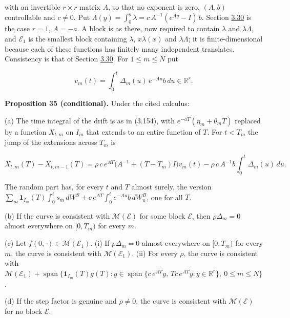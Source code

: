 \documentclass[11pt]{article}
\begin{document}
with an invertible \(r\times r\) matrix \(A\), so that no exponent is zero, \((A,b)\) controllable and \(c\neq0\). Put \(\Lambda(y)=\int_0^y\lambda=c\,A^{-1}(e^{Ay}-I)\,b\). Section \hyperref[sec:3.30]{3.30} is the case \(r=1\), \(A=-a\). A block is as there, now required to contain \(\lambda\) and \(\lambda\Lambda\), and \(\mathcal E_1\) is the smallest block containing \(\lambda\), \(x\lambda(x)\) and \(\lambda\Lambda\); it is finite-dimensional because each of these functions has finitely many independent translates. Consistency is that of Section \hyperref[sec:3.30]{3.30}. For \(1\le m\le N\) put

\begin{equation*}
v_m(t)=\int_0^t\Delta_m(u)\,e^{-Au}b\,du\in\mathbb R^r. \tag{3.157}\label{eq:3.157}
\end{equation*}

\label{res:Proposition-35}
\textbf{Proposition 35 (conditional).} Under the cited calculus:

(a) The time integral of the drift is as in (3.154), with \(e^{-aT}(\eta_m+\theta_mT)\) replaced by a function \(X_{t,m}\) on \(I_m\) that extends to an entire function of \(T\). For \(t<T_m\) the jump of the extensions across \(T_m\) is

\begin{equation*}
X_{t,m}(T)-X_{t,m-1}(T)=\rho\,c\,e^{AT}\bigl(A^{-1}+(T-T_m)I\bigr)v_m(t)-\rho\,c\,A^{-1}b\int_0^t\Delta_m(u)\,du. \tag{3.158}\label{eq:3.158}
\end{equation*}

The random part has, for every \(t\) and \(T\) almost surely, the version \(\sum_m\mathbf 1_{I_m}(T)\int_0^ts_m\,dW^S+c\,e^{AT}\int_0^te^{-Au}b\,dW^B_u\), one for all \(T\).

(b) If the curve is consistent with \(\mathcal M(\mathcal E)\) for some block \(\mathcal E\), then \(\rho\Delta_m=0\) almost everywhere on \([0,T_m)\) for every \(m\).

(c) Let \(f(0,\cdot)\in\mathcal M(\mathcal E_1)\). (i) If \(\rho\Delta_m=0\) almost everywhere on \([0,T_m)\) for every \(m\), the curve is consistent with \(\mathcal M(\mathcal E_1)\). (ii) For every \(\rho\), the curve is consistent with \(\mathcal M(\mathcal E_1)+\operatorname{span}\{\mathbf 1_{I_m}(T)g(T):g\in\operatorname{span}\{c\,e^{AT}y,\,Tc\,e^{AT}y:y\in\mathbb R^r\},\ 0\le m\le N\}\).

(d) If the step factor is genuine and \(\rho\neq0\), the curve is consistent with \(\mathcal M(\mathcal E)\) for no block \(\mathcal E\).
\end{document}
